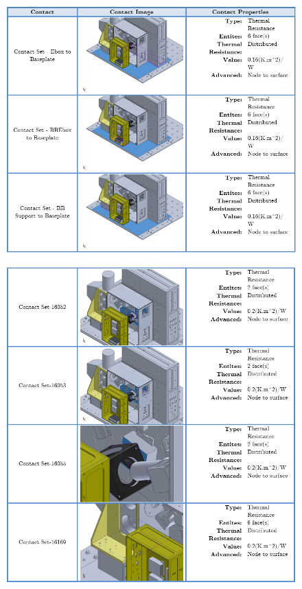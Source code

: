 \begin{figure}
    \centering
    \includegraphics[width=\textwidth]{thermal_load_images/ascent_pt1_TL_images/ascesnt_pt1_13.PNG}
\end{figure}

\begin{figure}
    \centering
    \includegraphics[width=\textwidth]{thermal_load_images/ascent_pt1_TL_images/ascesnt_pt1_14.PNG}
\end{figure}

